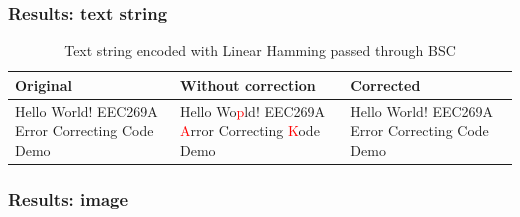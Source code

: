 \documentclass{article}
\begin{document}
\subsubsection{Results: text string}

\begin{table}[htb]
    \centering
    \caption{Text string encoded with Linear Hamming passed through BSC}
    \label{tab:text-linear-bsc}
    \renewcommand{\arraystretch}{1.5}
    \begin{tabulary}{\textwidth}{ |L|L|L| } 
    \hline
    \textbf{Original} & \textbf{Without correction} & \textbf{Corrected} \\
    \hline
    Hello World! EEC269A Error Correcting Code Demo & Hello Wo\textcolor{red}{p}ld! EEC269A \textcolor{red}{A}rror Correcting \textcolor{red}{K}ode Demo & Hello World! EEC269A Error Correcting Code Demo \\
    \hline
    \end{tabulary}
\end{table}




\subsubsection{Results: image}
\end{document}
